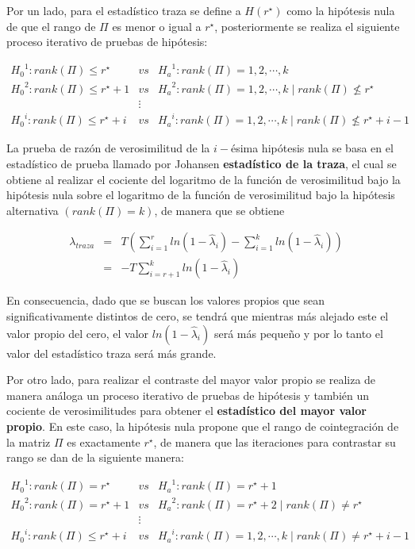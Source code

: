 Por un lado, para el estadístico traza se define a  $H(r^{\star})$ como la hipótesis nula de que el rango de $\Pi$ es menor o igual a $r^{\star}$,  posteriormente se realiza  el siguiente proceso iterativo de pruebas de hipótesis:

\begin{eqnarray}
{H_0}^1: rank(\Pi)\leq r^{\star} & vs & {H_a}^1: rank(\Pi)=1,2,\cdots,k \nonumber \\
 {H_0}^2: rank(\Pi)\leq r^{\star}+1 &vs& {H_a}^2: rank(\Pi)=1,2,\cdots,k \mid rank(\Pi)\nleqslant r^{\star} \nonumber\\
 &\vdots& \nonumber\\
{H_0}^i: rank(\Pi)\leq r^{\star}+i &vs& {H_a}^i: rank(\Pi)=1,2,\cdots,k\mid rank(\Pi)\nleqslant r^{\star}+i-1 \nonumber
\end{eqnarray}

La prueba de razón de verosimilitud de la $i-$ésima hipótesis nula se basa en el estadístico de prueba llamado por Johansen \textbf{estadístico de la traza}, el cual se obtiene al realizar el cociente del logaritmo de la función de verosimilitud bajo la hipótesis nula sobre el logaritmo de la función de verosimilitud bajo la hipótesis alternativa $( rank(\Pi)=k)$, de manera que se obtiene 

\begin{eqnarray}
\lambda_{traza} &=& T\left ( \sum_{i=1}^r ln(1-\widehat{\lambda}_i) - \sum_{i=1}^k ln(1-\widehat{\lambda}_i) \right ) \nonumber \\
 &=& -T \sum_{i=r+1}^k ln(1-\widehat{\lambda}_i) 
\end{eqnarray}

En consecuencia, dado que se buscan los valores propios que sean significativamente distintos de cero, se tendrá que mientras más alejado este el valor propio del cero, el valor $ln(1-\widehat{\lambda}_i)$ será más pequeño y por lo tanto el valor del estadístico traza será más grande.\bigskip 

Por otro lado, para realizar el contraste del mayor valor propio se realiza de manera análoga un proceso iterativo de pruebas de hipótesis y también un cociente de verosimilitudes para obtener el \textbf{estadístico  del mayor valor propio}. En este caso, la hipótesis nula propone que el rango de cointegración de la matriz $\Pi$ es exactamente $r^{\star}$, de manera que las iteraciones para contrastar su rango se dan de la siguiente manera:

\begin{eqnarray}
{H_0}^1: rank(\Pi) = r^{\star} & vs & {H_a}^1: rank(\Pi)=r^{\star} +1 \nonumber \\
 {H_0}^2: rank(\Pi)= r^{\star}+1 &vs& {H_a}^2: rank(\Pi)=r^{\star}+2 \mid rank(\Pi)\neq r^{\star} \nonumber\\
 &\vdots& \nonumber\\
{H_0}^i: rank(\Pi)\leq r^{\star}+i &vs& {H_a}^i: rank(\Pi)=1,2,\cdots,k\mid rank(\Pi)\neq r^{\star}+i-1 \nonumber
\end{eqnarray}


